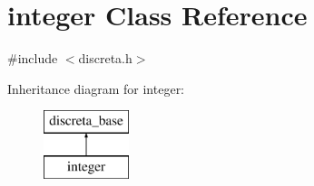 \hypertarget{classinteger}{}\section{integer Class Reference}
\label{classinteger}


{\ttfamily \#include $<$discreta.\+h$>$}

Inheritance diagram for integer\+:\begin{figure}[H]
\begin{center}
\leavevmode
\includegraphics[height=2.000000cm]{classinteger}
\end{center}
\end{figure}
